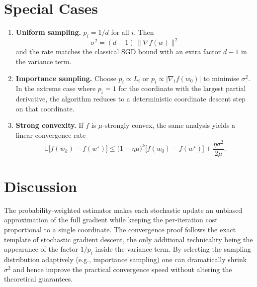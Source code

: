 \documentclass{article}
\newcommand{\E}{\mathbb{E}}
\begin{document}
\section*{Special Cases}
\begin{enumerate}[label=(\alph*)]
\item \textbf{Uniform sampling.} $p_i=1/d$ for all $i$. Then
\[
\sigma^{2}= (d-1)\,\|\nabla f(w)\|^{2}
\]
and the rate matches the classical SGD bound with an extra factor $d-1$ in the variance term.
\item \textbf{Importance sampling.} Choose $p_i\propto L_i$ or
$p_i\propto |\nabla_i f(w_0)|$ to minimise $\sigma^{2}$.
In the extreme case where $p_i=1$ for the coordinate with the largest
partial derivative, the algorithm reduces to a deterministic coordinate
descent step on that coordinate.
\item \textbf{Strong convexity.} If $f$ is $\mu$‑strongly convex, the same
analysis yields a linear convergence rate
\[
\E\!\bigl[f(w_k)-f(w^{\star})\bigr]\le
\bigl(1-\eta\mu\bigr)^{k}\bigl[f(w_0)-f(w^{\star})\bigr]
+\frac{\eta\sigma^{2}}{2\mu}.
\]
\end{enumerate}

\section*{Discussion}
The probability‑weighted estimator makes each stochastic update an
unbiased approximation of the full gradient while keeping the per‑iteration
cost proportional to a single coordinate. The convergence proof follows
the exact template of stochastic gradient descent, the only additional
technicality being the appearance of the factor $1/p_i$ inside the
variance term. By selecting the sampling distribution adaptively
(e.g., importance sampling) one can dramatically shrink $\sigma^{2}$ and
hence improve the practical convergence speed without altering the
theoretical guarantees.
\end{document}
